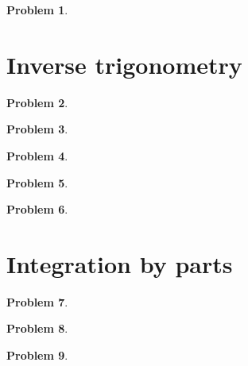 \documentclass{article}
\newtheorem{problem}{Problem}
\begin{document}
\begin{problem}

\end{problem}
\section{Inverse trigonometry}
\begin{problem}

\end{problem}


\begin{problem}

\end{problem}

\begin{problem}

\end{problem}


\begin{problem}

\end{problem}

\begin{problem}

\end{problem}

\section{Integration by parts}
\begin{problem}

\end{problem}


\begin{problem}

\end{problem}


\begin{problem}

\end{problem}
\end{document}
